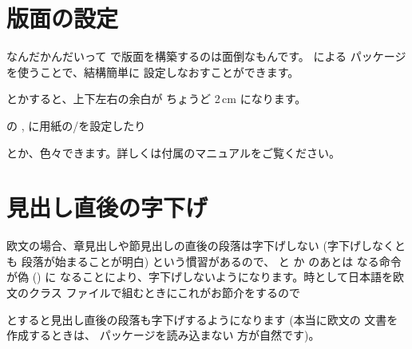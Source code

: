 
\section{版面の設定\texorpdfstring{\zdash}{---}}

なんだかんだいって \LaTeXe で版面を構築するのは面倒なもんです。
による  パッケージを使うことで、結構簡単に
設定しなおすことができます。
\begin{inputex}
\usepackage[margin=2cm]{geometry}
\end{inputex}
とかすると、上下左右の余白が ちょうど 2\,cm になります。
\begin{inputex}
\usepackage[papersize={width,height}]{geometry}
\end{inputex}
の ,  に用紙の/を設定したり
\begin{inputex}
\usepackage[paper=a4paper]{geometry}
\end{inputex}
とか、色々できます。詳しくは付属のマニュアルをご覧ください。

\section{見出し直後の字下げ\texorpdfstring{\zdash}{---}}
欧文の場合、章見出しや節見出しの直後の段落は字下げしない (字下げしなくとも
段落が始まることが明白) という慣習があるので、 と
か  のあとは  なる命令が偽 () に
なることにより、字下げしないようになります。時として日本語を欧文のクラス
ファイルで組むときにこれがお節介をするので
\begin{inputex}
\usepackage{indentfirst}
\end{inputex}
とすると見出し直後の段落も字下げするようになります  (本当に欧文の
文書を作成するときは、 パッケージを読み込まない
方が自然です)。


